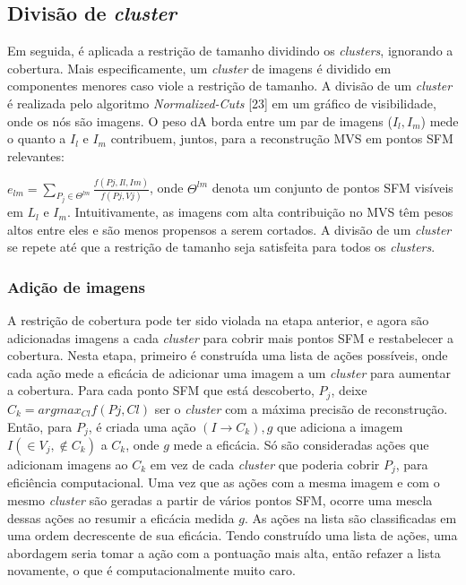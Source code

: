 \begin{itemize}
\subsection{Divisão de \emph{cluster}}
Em seguida, é aplicada a restrição de tamanho dividindo os \emph{clusters}, ignorando a cobertura. Mais especificamente, um \emph{cluster} de imagens é dividido em componentes menores caso viole a restrição de tamanho. A divisão de um \emph{cluster} é realizada pelo algoritmo \emph{Normalized-Cuts} %
[23] em um gráfico de visibilidade, onde os nós são imagens. O peso dA borda entre um par de imagens ($I_l, I_m$) mede o quanto a $I_l$ e $I_m$ contribuem, juntos,  para a reconstrução MVS em pontos SFM relevantes: 

$e_{lm} = \sum_{P_j \in \Theta ^{lm}} \frac{f(Pj,{Il, Im})}{f(Pj, Vj )}$, onde $\Theta ^{lm}$ denota um conjunto de pontos SFM visíveis em $L_l$ e $I_m$. Intuitivamente, as imagens com alta contribuição no MVS têm pesos altos entre eles e são menos propensos a serem cortados. A divisão de um \emph{cluster} se repete até que a restrição de tamanho seja satisfeita para todos os \emph{clusters}.

\subsubsection{Adição de imagens}
A restrição de cobertura pode ter sido violada na etapa anterior, e agora são adicionadas imagens a cada \emph{cluster} para cobrir mais pontos SFM e restabelecer a cobertura. Nesta etapa, primeiro é construída uma lista de ações possíveis, onde cada ação mede a eficácia de adicionar uma imagem a um \emph{cluster} para aumentar a cobertura. Para cada ponto SFM que está descoberto, $P_j$, deixe $C_k = argmax_{Cl} f(Pj, Cl)$ ser o \emph{cluster} com a máxima precisão de reconstrução. 
Então, para $P_j$, é criada uma ação ${(I \rightarrow C_k), g}$ que adiciona a imagem $I (\in V_j, \not\in C_k)$ a $C_k$, onde $g$ mede a eficácia. Só são consideradas ações que adicionam imagens ao $C_k$ em vez de cada \emph{cluster} que poderia cobrir $P_j$, para eficiência computacional. Uma vez que as ações com a mesma imagem e com o mesmo \emph{cluster} são geradas a partir de vários pontos SFM, ocorre uma mescla dessas ações ao resumir a eficácia medida $g$. As ações na lista são classificadas em uma ordem decrescente de sua eficácia. Tendo construído uma lista de ações, uma abordagem seria tomar a ação com a pontuação mais alta, então refazer a lista novamente, o que é computacionalmente muito caro. 


\end{itemize}

